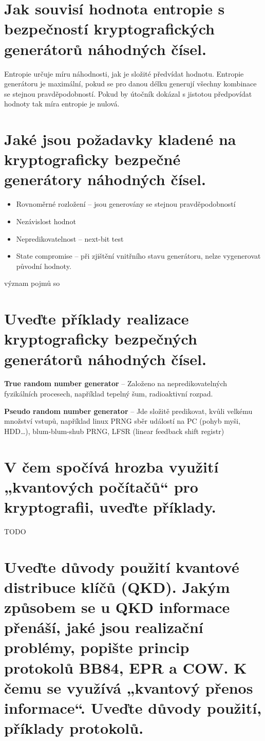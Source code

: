\section{Jak souvisí hodnota entropie s bezpečností kryptografických generátorů náhodných čísel.}

Entropie určuje míru náhodnosti, jak je složité předvídat hodnotu. Entropie generátoru je maximální, pokud se pro danou délku generují všechny kombinace se stejnou pravděpodobností. Pokud by útočník dokázal s jistotou předpovídat hodnoty tak míra entropie je nulová.

\section{Jaké jsou požadavky kladené na kryptograficky bezpečné generátory náhodných čísel.}

\begin{itemize}
    \item Rovnoměrné rozložení -- jsou generovány se stejnou pravděpodobností
    \item Nezávislost hodnot
    \item Nepredikovatelnost -- next-bit test
    \item State compromise -- při zjištění vnitřního stavu generátoru, nelze vygenerovat původní hodnoty.
\end{itemize}
význam pojmů so
\section{Uveďte příklady realizace kryptograficky bezpečných generátorů náhodných čísel.}

\textbf{True random number generator} -- Založeno na nepredikovatelných fyzikálních procesech, například tepelný šum, radioaktivní rozpad.

\textbf{Pseudo random number generator} -- Jde složitě predikovat, kvůli velkému množství vstupů, například linux PRNG sběr událostí na PC (pohyb myši, HDD\dots), blum-blum-shub PRNG, LFSR (linear feedback shift registr)

\section{V čem spočívá hrozba využití „kvantových počítačů“ pro kryptografii, uveďte příklady.}

TODO

\section{Uveďte důvody použití kvantové distribuce klíčů (QKD). Jakým způsobem se u QKD informace přenáší, jaké jsou realizační problémy, popište princip protokolů BB84, EPR a COW. K čemu se využívá „kvantový přenos informace“. Uveďte důvody použití, příklady protokolů.}

